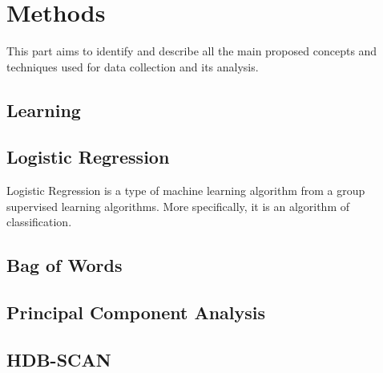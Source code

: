 \chapter{Methods}
This part aims to identify and describe all the main proposed concepts and techniques used for data collection and its analysis.
\section{Learning}
\section{Logistic Regression}
Logistic Regression is a type of machine learning algorithm from a group supervised learning algorithms. More specifically, it is an algorithm of classification.
\section{Bag of Words}
\section{Principal Component Analysis}
\section{HDB-SCAN}
